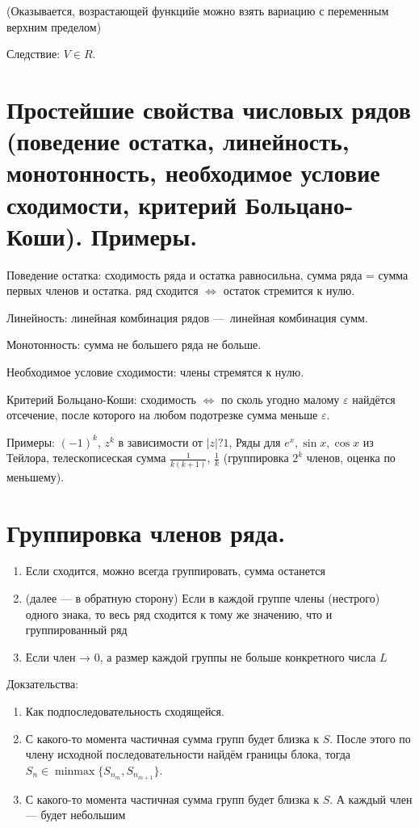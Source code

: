 \documentclass[12pt, a4paper]{article}
\begin{document}
    (Оказывается, возрастающей функцийе можно взять вариацию с переменным верхним пределом)

    Следствие: $V \in R$. 

\section{Простейшие свойства числовых рядов (поведение остатка, линейность, монотонность, необходимое условие сходимости, критерий Больцано-Коши). Примеры.}

Поведение остатка: 
сходимость ряда и остатка равносильна, 
сумма ряда = сумма первых членов и остатка.
ряд сходится $\Leftrightarrow$ остаток стремится к нулю. 

Линейность: линейная комбинация рядов — линейная комбинация сумм.

Монотонность: сумма не большего ряда не больше.

Необходимое условие сходимости: члены стремятся к нулю.

Критерий Больцано-Коши: сходимость $\Leftrightarrow$ по сколь угодно малому $\varepsilon$ 
найдётся отсечение, после которого на любом подотрезке сумма меньше $\varepsilon$.

Примеры: $(-1)^k$, $z^k$ в зависимости от $|z| ? 1$, Ряды для $e^x, \sin x, \cos x$ из Тейлора, телескописеская сумма $\frac{1}{k(k + 1)}$, $\frac{1}{k}$ (группировка $2^k$ членов, оценка по меньшему).

\section{Группировка членов ряда.}

\begin{enumerate}
    \item Если сходится, можно всегда группировать, сумма останется
    \item (далее — в обратную сторону) Если в каждой группе члены (нестрого) одного знака, то весь ряд сходится к тому же значению, что и группированный ряд
    \item Если член → 0, а размер каждой группы не больше конкретного числа $L$
\end{enumerate}

Докзательства:

\begin{enumerate}
    \item Как подпоследовательность сходящейся.
    \item С какого-то момента частичная сумма групп будет близка к $S$. 
    После этого по члену исходной последовательности найдём границы блока, тогда $S_n \in \operatorname{minmax} \{S_{n_m}, S_{n_{m + 1}}\}$.
    \item С какого-то момента частичная сумма групп будет близка к $S$. А каждый член — будет небольшим
\end{enumerate}
\end{document}

